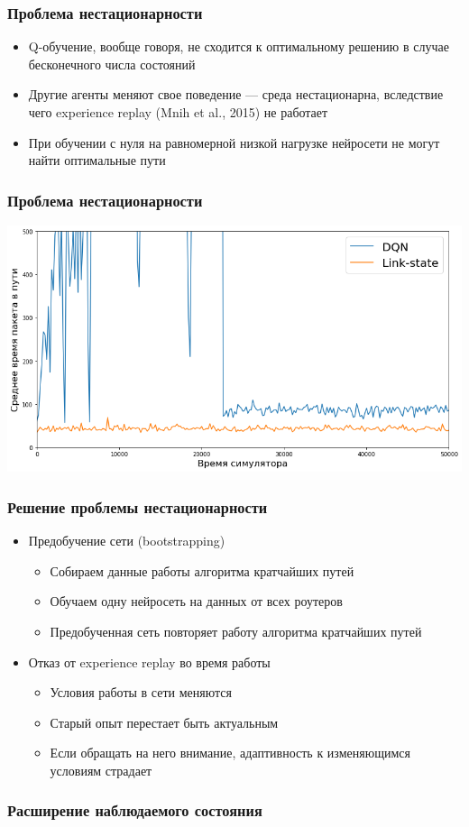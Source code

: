 \documentclass{beamer}
\begin{document}

\begin{frame}
  \frametitle{Проблема нестационарности}
  \begin{itemize}
    \item Q-обучение, вообще говоря, не сходится к оптимальному решению в случае
      бесконечного числа состояний
    \item Другие агенты меняют свое поведение --- среда нестационарна,
      вследствие чего experience replay (Mnih et al., 2015) не работает
    \item При обучении с нуля на равномерной низкой нагрузке нейросети не могут
      найти оптимальные пути
  \end{itemize}
\end{frame}


\begin{frame}
  \frametitle{Проблема нестационарности}
  \includegraphics[width=\textwidth]{non-convergence}
\end{frame}


\begin{frame}
  \frametitle{Решение проблемы нестационарности}
  \begin{itemize}
  \item Предобучение сети (bootstrapping)
    \begin{itemize}
      \item Собираем данные работы алгоритма кратчайших путей
      \item Обучаем одну нейросеть на данных от всех роутеров
      \item Предобученная сеть повторяет работу алгоритма кратчайших путей
    \end{itemize}
  \item Отказ от experience replay во время работы
    \begin{itemize}
    \item Условия работы в сети меняются
    \item Старый опыт перестает быть актуальным
    \item Если обращать на него внимание, адаптивность к изменяющимся условиям страдает
    \end{itemize}
  \end{itemize}
\end{frame}


\begin{frame}
  \frametitle{Расширение наблюдаемого состояния}
  
\end{frame}
\end{document}
